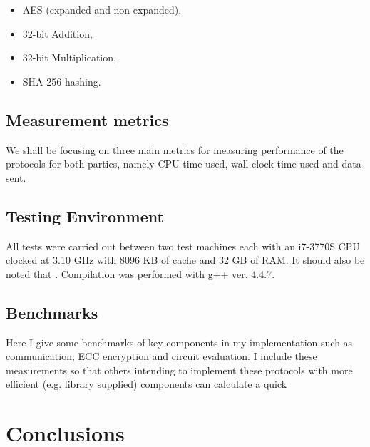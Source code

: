 \documentclass[a4paper,11pt]{article}
\begin{document}
		\begin{itemize}
			\item AES (expanded and non-expanded),
			\item 32-bit Addition,
			\item 32-bit Multiplication,
			\item SHA-256 hashing.
		\end{itemize}


		\subsection{Measurement metrics}
			We shall be focusing on three main metrics for measuring performance of the protocols for both parties, namely CPU time used, wall clock time used and data sent.\\

			

		\subsection{Testing Environment}
			All tests were carried out between two test machines each with an i7-3770S CPU clocked at 3.10 GHz with 8096 KB of cache and 32 GB of RAM. It should also be noted that . Compilation was performed with g++ ver. 4.4.7. 

		\subsection{Benchmarks}
			Here I give some benchmarks of key components in my implementation such as communication, ECC encryption and circuit evaluation. I include these measurements so that others intending to implement these protocols with more efficient (e.g. library supplied) components can calculate a quick 


	

	\section{Conclusions}
		
\end{document}
